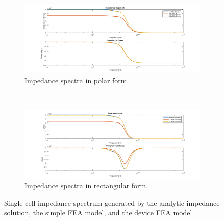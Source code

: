 \begin{figure}[H]
    \centering
    \begin{subfigure}[b]{\textwidth}
        \centering
        \includegraphics[width=\textwidth]{images/IS_model_mag_phase.png}
        \caption{Impedance spectra in polar form.}
    \end{subfigure}
    \\
    \vspace{0.1 in}
    \begin{subfigure}[b]{\textwidth}
        \centering
        \includegraphics[width=\textwidth]{images/IS_model_real_imag.png}
        \caption{Impedance spectra in rectangular form.}
    \end{subfigure}
    \caption[Analyitic and FEA generated single cell impedance spectrums]{Single cell impedance spectrum generated by the analytic impedance solution, the simple FEA model, and the device FEA model.}
    \label{fig:single_cell_model_IS_data}
\end{figure}

